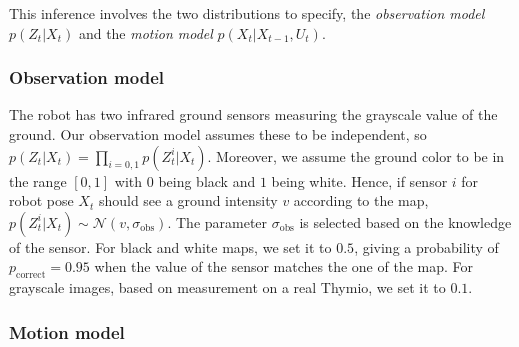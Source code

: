 \documentclass[letterpaper, 10pt, conference]{ieeeconf}
\begin{document}
This inference involves the two distributions to specify, the \emph{observation model} $p(Z_t | X_t)$ and the \emph{motion model} $p(X_t|X_{t-1}, U_t)$.

\subsubsection{Observation model}

The robot has two infrared ground sensors measuring the grayscale value of the ground.
Our observation model assumes these to be independent, so $p(Z_t | X_t) = \prod_{i=0,1} p(Z_t^{i} | X_t)$.
Moreover, we assume the ground color to be in the range $[0,1]$ with $0$ being black and $1$ being white.
Hence, if sensor $i$ for robot pose $X_t$ should see a ground intensity $v$ according to the map, $p(Z_t^{i} | X_t) \sim \mathcal{N}(v,\sigma_\mathrm{obs})$.
The parameter $\sigma_\mathrm{obs}$ is selected based on the knowledge of the sensor.
For black and white maps, we set it to $0.5$, giving a probability of $p_\mathrm{correct} = 0.95$ when the value of the sensor matches the one of the map.
For grayscale images, based on measurement on a real Thymio, we set it to $0.1$.

\subsubsection{Motion model}
\end{document}
